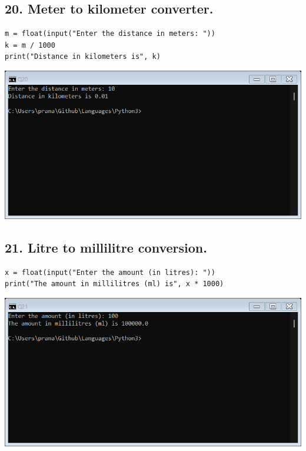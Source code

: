 \documentclass[12pt]{article}
\begin{document}
\subsection*{20. Meter to kilometer converter.}
\begin{verbatim}
m = float(input("Enter the distance in meters: "))
k = m / 1000
print("Distance in kilometers is", k)
\end{verbatim}
\includegraphics[width=\linewidth]{images/20.png}

\subsection*{21. Litre to millilitre conversion.}
\begin{verbatim}
x = float(input("Enter the amount (in litres): "))
print("The amount in millilitres (ml) is", x * 1000)
\end{verbatim}
\includegraphics[width=\linewidth]{images/21.png}
\end{document}
